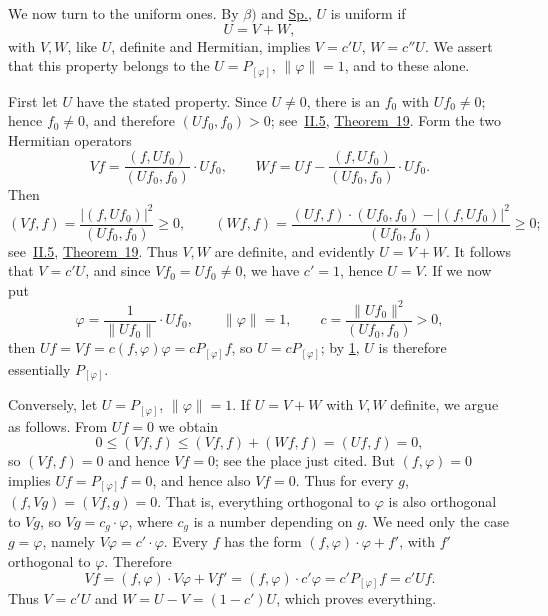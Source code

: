 \documentclass[fontsize=13pt,twoside,openany,headings=normal,parskip=false,bookmarkpackage=false,DIV=calc]{scrbook}
\begin{document}
We now turn to the uniform ones. By \hyperref[def:IV.1.beta]{$\beta)$} and \hyperref[eq:IV.2.Sp]{Sp.}, $U$ is uniform if
\[
U=V+W,
\]
with $V,W$, like $U$, definite and Hermitian, implies $V=c'U$, $W=c''U$. We assert that this property belongs to the $U=P_{[\varphi]}$, $\|\varphi\|=1$, and to these alone.

First let $U$ have the stated property. Since $U\ne0$, there is an $f_0$ with $Uf_0\ne0$; hence $f_0\ne0$, and therefore $(Uf_0,f_0)>0$; see~\hyperref[sec:II.5]{II.5}, \hyperref[thm:II.19]{Theorem~19}. Form the two Hermitian operators
\[
Vf=\frac{(f,Uf_0)}{(Uf_0,f_0)}\cdot Uf_0,\qquad
Wf=Uf-\frac{(f,Uf_0)}{(Uf_0,f_0)}\cdot Uf_0.
\]
Then
\[
(Vf,f)=\frac{|(f,Uf_0)|^2}{(Uf_0,f_0)}\geq0,\qquad
(Wf,f)=\frac{(Uf,f)\cdot(Uf_0,f_0)-|(f,Uf_0)|^2}{(Uf_0,f_0)}\geq0;
\]
see~\hyperref[sec:II.5]{II.5}, \hyperref[thm:II.19]{Theorem~19}. Thus $V,W$ are definite, and evidently $U=V+W$. It follows that $V=c'U$, and since $Vf_0=Uf_0\ne0$, we have $c'=1$, hence $U=V$. If we now put
\[
\varphi=\frac{1}{\|Uf_0\|}\cdot Uf_0,\qquad\|\varphi\|=1,\qquad
c=\frac{\|Uf_0\|^2}{(Uf_0,f_0)}>0,
\]
\hypertarget{origpage-170}{}%
then $Uf=Vf=c(f,\varphi)\varphi=cP_{[\varphi]}f$, so $U=cP_{[\varphi]}$; by \hyperref[remark:IV.2.1]{1}, $U$ is therefore essentially $P_{[\varphi]}$.

Conversely, let $U=P_{[\varphi]}$, $\|\varphi\|=1$. If $U=V+W$ with $V,W$ definite, we argue as follows. From $Uf=0$ we obtain
\[
0\leq(Vf,f)\leq(Vf,f)+(Wf,f)=(Uf,f)=0,
\]
so $(Vf,f)=0$ and hence $Vf=0$; see the place just cited. But $(f,\varphi)=0$ implies $Uf=P_{[\varphi]}f=0$, and hence also $Vf=0$. Thus for every $g$, $(f,Vg)=(Vf,g)=0$. That is, everything orthogonal to $\varphi$ is also orthogonal to $Vg$, so $Vg=c_g\cdot\varphi$, where $c_g$ is a number depending on $g$. We need only the case $g=\varphi$, namely $V\varphi=c'\cdot\varphi$. Every $f$ has the form $(f,\varphi)\cdot\varphi+f'$, with $f'$ orthogonal to $\varphi$. Therefore
\[
Vf=(f,\varphi)\cdot V\varphi+Vf'=(f,\varphi)\cdot c'\varphi=c'P_{[\varphi]}f=c'Uf.
\]
Thus $V=c'U$ and $W=U-V=(1-c')U$, which proves everything.
\end{document}
